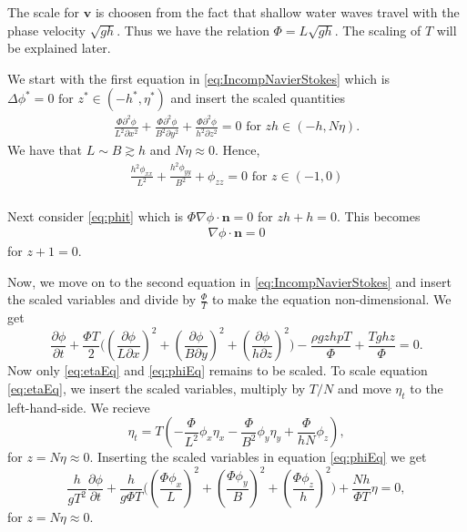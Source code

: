 \documentclass[11pt]{article}
\begin{document}
The scale for $\bm{v}$ is choosen from the fact that shallow water waves travel with the phase velocity $\sqrt{gh}$. Thus we have the relation $\Phi= L \sqrt{gh}$. The scaling of $T$ will be explained later. 


We start with the first equation in \eqref{eq:IncompNavierStokes} which is $\Delta \phi^* = 0 \text{ for } z^* \in(-h^*, \eta^*)$ and insert the scaled quantities
\begin{align*}
\frac{\Phi\partial^2\phi}{L^2\partial x^{2}} +  \frac{\Phi\partial^2\phi}{B^2\partial y^{2}} + \frac{\Phi\partial^2\phi}{h^2\partial z^{2}} = 0 \text{ for } zh \in(-h, N\eta).
\end{align*}
We have that $L \sim B \gtrsim h$ and $N\eta \approx 0$. Hence,
\begin{equation}\label{2.8a scaled}
\begin{aligned}
\frac{h^2\phi_{xx}}{L^2} + \frac{h^2\phi_{yy}}{B^2} + \phi_{zz} = 0 \text{ for } z \in(-1,0) \\
\end{aligned}
\end{equation}


Next consider \eqref{eq:phit} which is $
\Phi \nabla \phi \cdot \bm{n} = 0 $ for $ zh + h = 0$. This becomes
\begin{align}\label{2.9a scaled}
\nabla \phi \cdot \bm{n} = 0
\end{align}
for $z +1 = 0$.


Now, we move on to the second equation in \eqref{eq:IncompNavierStokes} and insert the scaled variables and divide by $\frac{\Phi}{T}$ to make the equation non-dimensional. We get
\begin{equation*}
\frac{\partial \phi}{\partial t} + \frac{\Phi T}{2}\Big((\frac{\partial \phi}{L\partial x})^2 + (\frac{\partial\phi}{B\partial y})^2 + (\frac{\partial \phi}{h\partial z})^2\Big) - \frac{\rho g z h p T }{\Phi} + \frac{Tghz}{\Phi} = 0.
\end{equation*}
Now only \eqref{eq:etaEq} and \eqref{eq:phiEq} remains to be scaled. %
To scale equation \eqref{eq:etaEq}, we insert the scaled variables, multiply by $T/N$ and move $\eta_t$ to the left-hand-side. We recieve
\begin{equation} \label{etat}
 \eta_t = T (-\frac{\Phi}{L^2} \phi_x  \eta_x - \frac{\Phi}{B^2} \phi_y \eta_y + \frac{\Phi}{hN} \phi_z ),
\end{equation}
for $z = N\eta \approx 0$.
Inserting the scaled variables in equation \eqref{eq:phiEq} we get
\begin{equation} \label{eq13}
\frac{ h}{g T^2 } \frac{\partial \phi }{\partial t} + \frac{h}{g\Phi T}\Big((\frac{\Phi \phi_x}{L})^2+(\frac{\Phi \phi_y}{B})^2+(\frac{\Phi \phi_z}{h})^2\Big) + \frac{Nh}{\Phi T}\eta = 0,
\end{equation}
for $z = N\eta \approx 0$.
\end{document}
